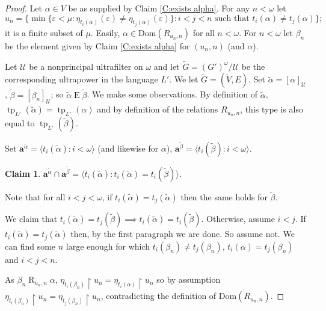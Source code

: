 \documentclass[a4paper]{amsart}
\theoremstyle{plain}
\newtheorem{claim}{Claim}[theorem]
\theoremstyle{definition}
\theoremstyle{remark}
\numberwithin{equation}{section}
\newenvironment{claimproof}[1][\proofname]
  {%
    \proof[#1]%
      \renewcommand*\qedsymbol{$\square$ (claim)}%
  }
  {%
    \endproof%
  }
\newcommand{\dom}{\mathrm{Dom}}
\newcommand{\E}{\mathrel{E}}
\newcommand{\R}{\mathrel{R}}
\DeclareMathOperator{\tp}{tp}
\begin{document}
\begin{proof}
Let $\alpha\in V$ be as supplied by Claim \ref{C:exists alpha}. For any $n<\omega$ let \[u_n=\{\min\{\varepsilon<\mu: \eta_{t_i(\alpha)}(\varepsilon)\neq \eta_{t_j(\alpha)}(\varepsilon)\}:i<j<n \text{ such that $t_i(\alpha)\neq t_j(\alpha)$}\};\] it is a finite subset of $\mu$. Easily, $\alpha\in \dom(R_{u_n,n})$ for all $n<\omega$. For $n<\omega$ let $\beta_n$ be the element given by Claim \ref{C:exists alpha} for $(u_n,n)$ (and $\alpha$).

Let  $\mathcal{U}$ be a nonprincipal ultrafilter on $\omega$ and let $\widetilde G=(G')^\omega/\mathcal{U}$ be the corresponding ultrapower in the language $L'$. We let $\widetilde G=(\widetilde V,E)$. Set $\widetilde \alpha=[\alpha]_{\mathcal{U}}$, $\widetilde \beta=[\beta_n]_{\mathcal{U}}$; so $\widetilde \alpha \E \widetilde \beta$. 
We make some observations. By definition of $\widetilde \alpha$, $\tp_{L'}(\widetilde \alpha)= \tp_{L'}(\alpha)$ and by definition of the relations $R_{u_n,n}$, this type is also equal to $\tp_{L'}(\widetilde \beta)$. 


Set $\mathbf{a}^{\widetilde \alpha}=\langle t_i(\widetilde \alpha):i<\omega\rangle$ (and likewise for $\alpha$), $\mathbf{a}^{\widetilde \beta}=\langle t_i(\widetilde \beta):i<\omega\rangle$.

\begin{claim}\label{C: enumerate me}
$\mathbf{a}^{\widetilde \alpha}\cap \mathbf{a}^{\widetilde \beta}=\langle t_i(\widetilde \alpha):t_i(\widetilde \alpha)=t_i(\widetilde \beta)\rangle$.
\end{claim}
\begin{claimproof}
Note that for all $i<j<\omega$, if $t_i(\widetilde \alpha)=t_j(\widetilde \alpha)$ then the same holds for $\widetilde \beta$.

We claim that $t_i(\widetilde \alpha)=t_j(\widetilde \beta) \implies t_i(\widetilde \alpha)=t_i(\widetilde \beta)$. Otherwise, assume $i<j$. If $t_i(\widetilde \alpha)=t_j(\widetilde \alpha)$ then, by the first paragraph we are done. So assume not.  We can find some $n$ large enough for which $t_i(\beta_n)\neq t_j(\beta_n)$, $t_i(\alpha)=t_j(\beta_n)$ and $i< j<n$.



As $\beta_n\R_{u_n,n} \alpha$, $\eta_{t_i(\beta_n)}\restriction u_n=\eta_{t_i(\alpha)}\restriction u_n$ so by assumption $\eta_{t_i(\beta_n)}\restriction u_n=\eta_{t_j(\beta_n)}\restriction u_n$, contradicting the definition of $\dom(R_{u_n,n})$.
\end{claimproof}



\end{proof}
\end{document}
